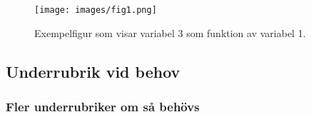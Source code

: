 
\begin{figure}[ht]
\begin{center}
  \texttt{[image: images/fig1.png]}
  \caption{Exempelfigur som visar variabel 3 som funktion av variabel 1. \label{fvariabel3vs1}}
\end{center}
\end{figure}

\subsection{Underrubrik vid behov}

\subsubsection{Fler underrubriker om så behövs}
